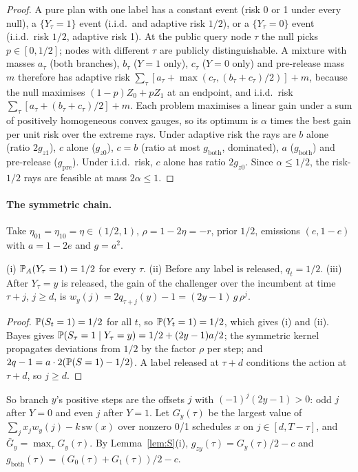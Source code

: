 \begin{proof}
A pure plan with one label has a constant event (risk 0 or 1 under every null), a $\{Y_\tau=1\}$ event (i.i.d.\ and adaptive risk $1/2$), or a $\{Y_\tau=0\}$ event (i.i.d.\ risk $1/2$, adaptive risk 1). At the public query node $\tau$ the null picks $p\in[0,1/2]$; nodes with different $\tau$ are publicly distinguishable. A mixture with masses $a_\tau$ (both branches), $b_\tau$ ($Y=1$ only), $c_\tau$ ($Y=0$ only) and pre-release mass $m$ therefore has adaptive risk $\sum_\tau[a_\tau+\max(c_\tau,(b_\tau+c_\tau)/2)]+m$, because the null maximises $(1-p)Z_0+pZ_1$ at an endpoint, and i.i.d.\ risk $\sum_\tau[a_\tau+(b_\tau+c_\tau)/2]+m$. Each problem maximises a linear gain under a sum of positively homogeneous convex gauges, so its optimum is $\alpha$ times the best gain per unit risk over the extreme rays. Under adaptive risk the rays are $b$ alone (ratio $2g_{z1}$), $c$ alone ($g_{z0}$), $c=b$ (ratio at most $g_{\mathrm{both}}$, dominated), $a$ ($g_{\mathrm{both}}$) and pre-release ($g_{\mathrm{pre}}$). Under i.i.d.\ risk, $c$ alone has ratio $2g_{z0}$. Since $\alpha\le1/2$, the risk-$1/2$ rays are feasible at mass $2\alpha\le1$.
\end{proof}

\paragraph{The symmetric chain.} Take $\eta_{01}=\eta_{10}=\eta\in(1/2,1)$, $\rho=1-2\eta=-r$, prior $1/2$, emissions $(e,1-e)$ with $a=1-2e$ and $g=a^2$.

\begin{lemma}
\label{lem:S}
(i) $\mathbb{P}_A(Y_\tau=1)=1/2$ for every $\tau$. (ii) Before any label is released, $q_t=1/2$. (iii) After $Y_\tau=y$ is released, the gain of the challenger over the incumbent at time $\tau+j$, $j\ge d$, is $w_y(j)=2q_{\tau+j}(y)-1=(2y-1)\,g\,\rho^j$.
\end{lemma}

\begin{proof}
$\mathbb{P}(S_t=1)=1/2$ for all $t$, so $\mathbb{P}(Y_t=1)=1/2$, which gives (i) and (ii). Bayes gives $\mathbb{P}(S_\tau=1\mid Y_\tau=y)=1/2+(2y-1)a/2$; the symmetric kernel propagates deviations from $1/2$ by the factor $\rho$ per step; and $2q-1=a\cdot2(\mathbb{P}(S=1)-1/2)$. A label released at $\tau+d$ conditions the action at $\tau+d$, so $j\ge d$.
\end{proof}

So branch $y$'s positive steps are the offsets $j$ with $(-1)^j(2y-1)>0$: odd $j$ after $Y=0$ and even $j$ after $Y=1$. Let $G_y(\tau)$ be the largest value of $\sum_jx_jw_y(j)-k\,\mathrm{sw}(x)$ over nonzero 0/1 schedules $x$ on $j\in[d,T-\tau]$, and $\bar G_y=\max_\tau G_y(\tau)$. By Lemma~\ref{lem:S}(i), $g_{zy}(\tau)=G_y(\tau)/2-c$ and $g_{\mathrm{both}}(\tau)=(G_0(\tau)+G_1(\tau))/2-c$.


